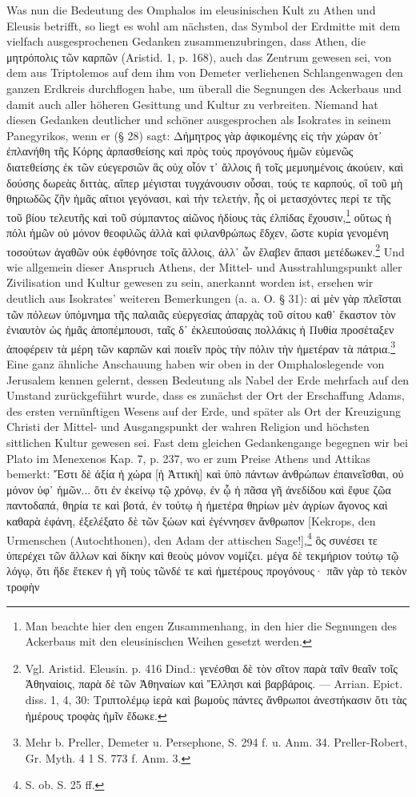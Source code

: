 \documentclass[a4paper, 11pt, oneside]{article}
\begin{document}
Was nun die Bedeutung des Omphalos im eleusinischen Kult zu Athen und Eleusis betrifft, so liegt es wohl am nächsten, das Symbol der Erdmitte mit dem vielfach ausgesprochenen Gedanken zusammenzubringen, dass Athen, die μητρόπολις τῶν καρπῶν (Aristid. 1, p. 168), auch das Zentrum gewesen sei, von dem aus Triptolemos auf dem ihm von Demeter verliehenen Schlangenwagen den ganzen Erdkreis durchflogen habe, um überall die Segnungen des Ackerbaus und damit auch aller höheren Gesittung und Kultur zu verbreiten. Niemand hat diesen Gedanken deutlicher und schöner ausgesprochen als Isokrates in seinem Panegyrikos, wenn er (§ 28) sagt: Δήμητρος γὰρ ἀφικομένης εἰς τὴν χώραν ὁτ᾽ ἐπλανήθη τῆς Κόρης ἁρπασθείσης καὶ πρὸς τοὺς προγόνους ἡμῶν εὐμενῶς διατεθείσης ἐκ τῶν εὐεγερσιῶν ἃς οὐχ οἷόν τ᾽ ἄλλοις ἢ τοῖς μεμυημένοις ἀκούειν, καὶ δούσης δωρεὰς διττὰς, αἴπερ μέγισται τυγχάνουσιν οὗσαι, τούς τε καρπούς, οἳ τοῦ μὴ θηριωδῶς ζῆν ἡμᾶς αἴτιοι γεγόνασι, καὶ τὴν τελετήν, ἧς οἱ μετασχόντες περί τε τῆς τοῦ βίου τελευτῆς καὶ τοῦ σύμπαντος αἰῶνος ἡδίους τὰς ἐλπίδας ἔχουσιν,\footnote{Man beachte hier den engen Zusammenhang, in den hier die Segnungen des Ackerbaus mit den eleusinischen Weihen gesetzt werden.} οὕτως ἡ πόλι ἡμῶν οὐ μόνον θεοφιλῶς ἀλλὰ καὶ φιλανθρώπως ἔδχεν, ὥστε κυρία γενομένη τοσούτων ἀγαθῶν οὐκ ἐφθόνησε τοῖς ἄλλοις, ἀλλ᾽ ὧν ἔλαβεν ἅπασι μετέδωκεν.\footnote{Vgl. Aristid. Eleusin. p. 416 Dind.: γενέσθαι δὲ τὸν σῖτον παρὰ ταῖν θεαῖν τοῖς Ἀθηναίοις, παρὰ δὲ τῶν Ἀθηναίων καὶ Ἕλλησι καὶ βαρβάροις. --- Arrian. Epict. diss. 1, 4, 30: Τριπτολέμῳ ἱερὰ καὶ βωμοὺς πάντες ἄνθρωποι ἀνεστήκασιν ὅτι τὰς ἡμέρους τροφὰς ἡμῖν ἔδωκε.} Und wie allgemein dieser Anspruch Athens, der Mittel- und Ausstrahlungspunkt aller Zivilisation und Kultur gewesen zu sein, anerkannt worden ist, ersehen wir deutlich aus Isokrates' weiteren Bemerkungen (a. a. O. § 31): αἱ μὲν γὰρ πλεῖσται τῶν πόλεων ὑπόμνημα τῆς παλαιᾶς εὐεργεσίας ἀπαρχὰς τοῦ σίτου καθ᾽ ἕκαστον τὸν ἐνιαυτὸν ὡς ἡμᾶς ἀποπέμπουσι, ταῖς δ᾽ ἐκλειπούσαις πολλάκις ἡ Πυθία προσέταξεν ἀποφέρειν τὰ μέρη τῶν καρπῶν καὶ ποιεῖν πρὸς τὴν πόλιν τὴν ἡμετέραν τὰ πάτρια.\footnote{Mehr b. Preller, Demeter u. Persephone, S. 294 f. u. Anm. 34. Preller-Robert, Gr. Myth. 4 1 S. 773 f. Anm. 3.} Eine ganz ähnliche Anschauung haben wir oben in der Omphaloslegende von Jerusalem kennen gelernt, dessen Bedeutung als Nabel der Erde mehrfach auf den Umstand zurückgeführt wurde, dass es zunächst der Ort der Erschaffung Adams, des ersten vernünftigen Wesens auf der Erde, und später als Ort der Kreuzigung Christi der Mittel- und Ausgangspunkt der wahren Religion und höchsten sittlichen Kultur gewesen sei. Fast dem gleichen Gedankengange begegnen wir bei Plato im Menexenos Kap. 7, p. 237, wo er zum Preise Athens und Attikas bemerkt: Ἔστι δὲ ἀξία ἡ χώρα [ἡ Ἀττικὴ] καὶ ὑπὸ πάντων ἀνθρώπων ἐπαινεῖσθαι, οὐ μόνον ὑφ᾽ ἡμῶν... ὅτι ἐν ἐκείνῳ τῷ χρόνῳ, ἐν ᾧ ἡ πᾶσα γῆ ἀνεδίδου καὶ ἔφυε ζῶα παντοδαπά, θηρία τε καὶ βοτά, ἐν τούτῳ ἡ ἡμετέρα θηρίων μὲν ἀγρίων ἄγονος καὶ καθαρὰ ἐφάνη, ἐξελέξατο δὲ τῶν ξώων καὶ ἐγέννησεν ἄνθρωπον [Kekrops, den Urmenschen (Autochthonen), den Adam der attischen Sage!],\footnote{S. ob. S. 25 ff.} ὃς συνέσει τε ὑπερέχει τῶν ἄλλων καὶ δίκην καὶ θεοὺς μόνον νομίζει. μέγα δὲ τεκμήριον τούτῳ τῷ λόγῳ, ὅτι ἥδε ἔτεκεν ἡ γῆ τοὺς τῶνδέ τε καὶ ἡμετέρους προγόνους· πᾶν γὰρ τὸ τεκὸν τροφὴν 
\end{document}
